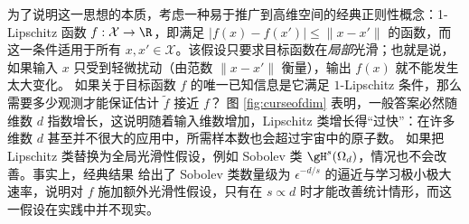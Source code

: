 为了说明这一思想的本质，考虑一种易于推广到高维空间的经典正则性概念：1-Lipschitz 函数 $f:\mathcal{X} \to \R$，即满足 $|f(x) - f(x')| \leq \|x - x'\|$ 的函数，而这一条件适用于所有 $x, x' \in \mathcal{X}$。该假设只要求目标函数在\emph{局部}光滑；也就是说，如果输入 $x$ 只受到轻微扰动（由范数 $\|x - x'\|$ 衡量），输出 $f(x)$ 就不能发生太大变化。%
如果关于目标函数 $f$ 的唯一已知信息是它满足 $1$-Lipschitz 条件，那么需要多少观测才能保证估计 $\tilde{f}$ 接近 $f$？
图 \ref{fig:curseofdim} 表明，一般答案必然随维数 $d$ 指数增长，这说明随着输入维数增加，Lipschitz 类增长得“过快”：在许多维数 $d$ 甚至并不很大的应用中，所需样本数也会超过宇宙中的原子数。
如果把 Lipschitz 类替换为全局光滑性假设，例如 Sobolev 类 $\gH^{s}(\Omega_d)$，情况也不会改善。事实上，经典结果 \citep{tsybakov2008introduction} 给出了 Sobolev 类数量级为 $\epsilon^{-d/s}$ 的逼近与学习极小极大速率，说明对 $f$ 施加额外光滑性假设，只有在 $s \propto d$ 时才能改善统计情形，而这一假设在实践中并不现实。



